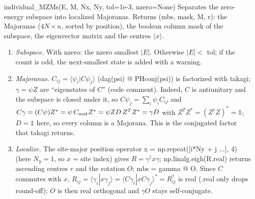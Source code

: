 \documentclass[11pt]{article}
\newcommand{\codeus}{\textunderscore\allowbreak}
\renewcommand{\code}[1]{{\ttfamily\let\_\codeus #1}}
\begin{document}
\begin{function}{individual\_MZMs(E, M, Nx, Ny, tol=1e-3, nzero=None)}
Separates the zero-energy subspace into localized Majoranas. Returns \code{(mbs, mask, M, r)}: the Majoranas ($4N\times n$, sorted by position), the boolean column mask of the subspace, the eigenvector matrix and the centres $\langle x\rangle$.
\begin{enumerate}
\item \emph{Subspace.} With \code{nzero}: the \code{nzero} smallest $|E|$. Otherwise $|E|<$ \code{tol}; if the count is odd, the next-smallest state is added with a warning.
\item \emph{Majoranas.} $C_{ij}=\langle\psi_i|C\psi_j\rangle$ (\code{dag(psi) @ PHconj(psi)}) is factorized with \code{takagi}; $\gamma=\psi Z$ are ``eigenstates of $C$'' (code comment). Indeed, $C$ is antiunitary and the subspace is
closed under it, so $C\psi_j=\sum_i\psi_iC_{ij}$ and $C\gamma=(C\psi)Z^*=\psi\,C_{\rm mat}Z^*=\psi ZD\,Z^TZ^*=\gamma D$ with $Z^TZ^*=(Z^\dagger Z)^*=\mathbb 1$;
$D=\mathbb 1$ here, so every column is a Majorana. This is the conjugated factor that \code{takagi} returns.
\item \emph{Localize.} The site-major position operator \code{x = np.repeat([i*Ny + j ...], 4)} (here $N_y=1$, so $x$ = site index) gives $R=\gamma^\dagger x\gamma$; \code{np.linalg.eigh(R.real)} returns ascending centres $r$ and the rotation $O$; \code{mbs = gamma @ O}. Since $C$ commutes with $x$,
$R_{ij}=\langle\gamma_i|x\gamma_j\rangle=\langle C\gamma_i|xC\gamma_j\rangle^*=R_{ij}^*$ is real (\code{.real} only drops round-off); $O$ is then real
orthogonal and $\gamma O$ stays self-conjugate.
\end{enumerate}
\end{function}
\end{document}
